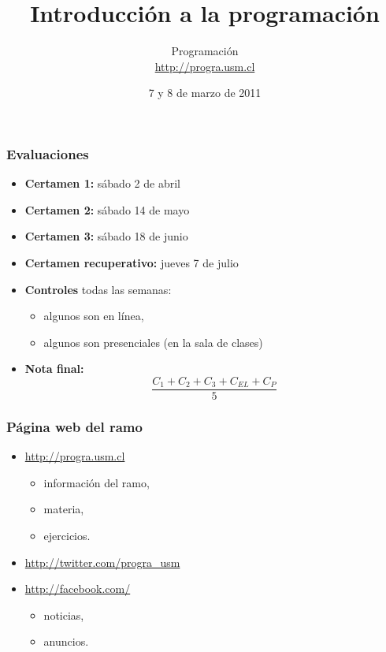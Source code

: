 \documentclass[12pt]{beamer}
\title{Introducción a la programación}
\author{Programación \\ \url{http://progra.usm.cl}}
\date{7 y 8 de marzo de 2011}
\begin{document}
  \begin{frame}
    \maketitle
  \end{frame}

  \begin{frame}
    \frametitle{Evaluaciones}\label{evaluaciones}
    \begin{itemize}
      \item \textbf{Certamen 1:} sábado  2 de abril
      \item \textbf{Certamen 2:} sábado 14 de mayo
      \item \textbf{Certamen 3:} sábado 18 de junio
      \item \textbf{Certamen recuperativo:} jueves 7 de julio
      \vfill
      \item \textbf{Controles} \alert{todas las semanas}:
      \begin{itemize}
        \item algunos son en línea,
        \item algunos son presenciales (en la sala de clases)
      \end{itemize}
      \vfill
      \item \textbf{Nota final:}
        \[ \frac{C_1 + C_2 + C_3 + C_{EL} + C_P}{5} \]
    \end{itemize}
  \end{frame}

  \begin{frame}
    \frametitle{Página web del ramo}
    \begin{itemize}
      \item \url{http://progra.usm.cl}
        \begin{itemize}
          \item información del ramo,
          \item materia,
          \item ejercicios.
        \end{itemize}
      \vfill
      \item \url{http://twitter.com/progra_usm}
      \item \url{http://facebook.com/}
        \begin{itemize}
          \item noticias,
          \item anuncios.
        \end{itemize}
    \end{itemize}
  \end{frame}
\end{document}
